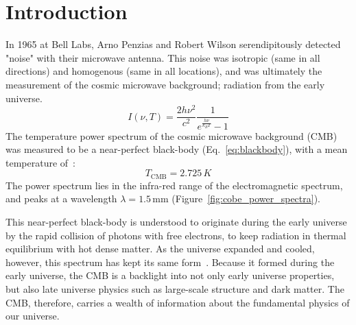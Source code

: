 
\chapter{Introduction} %

\label{ch:intro} %


\newcommand{\keyword}[1]{\textbf{#1}}
\newcommand{\tabhead}[1]{\textbf{#1}}
\newcommand{\code}[1]{\texttt{#1}}
\newcommand{\file}[1]{\texttt{\bfseries#1}}
\newcommand{\option}[1]{\texttt{\itshape#1}}

In 1965 at Bell Labs, Arno Penzias and Robert Wilson serendipitously detected "noise" with their microwave antenna.  This noise was isotropic (same in all directions) and homogenous (same in all locations), and was ultimately the measurement of the cosmic microwave background; radiation from the early universe.
\begin{equation}
    I(\nu,T) = \frac{2h\nu^2}{c^2}\frac{1}{e^{\frac{h\nu}{k_B T}} -1}
    \label{eq:blackbody}
\end{equation}
The temperature power spectrum of the cosmic microwave background (CMB) was measured to be a near-perfect black-body (Eq.~\ref{eq:blackbody}), with a mean temperature of~\cite{burke_graham-smith_wilkinson_2019}:
\begin{equation}
    T_{\text{CMB}} = 2.725\,K
\end{equation}
The power spectrum lies in the infra-red range of the electromagnetic spectrum, and peaks at a wavelength $\lambda = 1.5\,\text{mm}$ (Figure~\ref{fig:cobe_power_spectra}). 

This near-perfect black-body is understood to originate during the early universe by the rapid collision of photons with free electrons, to keep radiation in thermal equilibrium with hot dense matter.  As the universe expanded and cooled, however, this spectrum has kept its same form~\cite{weinberg_cosmo}.  Because it formed during the early universe, the CMB is a backlight into not only early universe properties, but also late universe physics such as large-scale structure and dark matter.  The CMB, therefore, carries a wealth of information about the fundamental physics of our universe.

